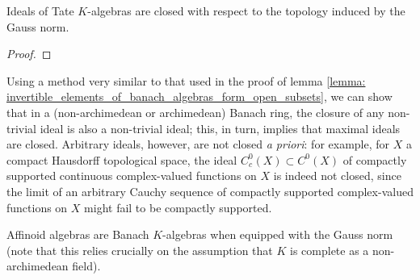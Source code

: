            \begin{lemma} \label{lemma: tate_algebra_ideals_are_closed}
                Ideals of Tate $K$-algebras are closed with respect to the topology induced by the Gauss norm.
            \end{lemma}
                \begin{proof}
                    
                \end{proof}
            \begin{remark} \label{remark: maximal_ideals_of_banach_algebras_are_closed}
                Using a method very similar to that used in the proof of lemma \ref{lemma: invertible_elements_of_banach_algebras_form_open_subsets}, we can show that in a (non-archimedean or archimedean) Banach ring, the closure of any non-trivial ideal is also a non-trivial ideal; this, in turn, implies that maximal ideals are closed. Arbitrary ideals, however, are not closed \textit{a priori}: for example, for $X$ a compact Hausdorff topological space, the ideal $C^0_c(X) \subset C^0(X)$ of compactly supported continuous complex-valued functions on $X$ is indeed not closed, since the limit of an arbitrary Cauchy sequence of compactly supported complex-valued functions on $X$ might fail to be compactly supported. 
            \end{remark}
            \begin{proposition} \label{prop: affinoid_algebras_are_banach_algebras}
                Affinoid algebras are Banach $K$-algebras when equipped with the Gauss norm (note that this relies crucially on the assumption that $K$ is complete as a non-archimedean field).
            \end{proposition}
